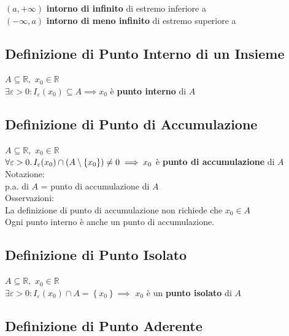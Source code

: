 \documentclass[a4paper, twoside, italian, 11pt]{book}
\newcommand{\braces}[1] {\left \{ #1 \right \}}
\newcommand{\R}{\mathbb{R}}
\begin{document}
$(a, +\infty)$ \textbf{intorno di infinito} di estremo inferiore a \\
\indent
$(-\infty, a)$ \textbf{intorno di meno infinito} di estremo superiore a


\subsection{Definizione di Punto Interno di un Insieme}

\noindent
$A \subseteq \R,$ $x_0 \in \R$ \\

$\exists \varepsilon > 0 : I_\varepsilon(x_0) \subseteq A \implies x_0$ è \textbf{punto interno} di $A$


\subsection{Definizione di Punto di Accumulazione}

\noindent
$A \subseteq \R,$ $x_0 \in \R$ \\

$\forall \varepsilon > 0 \ldotp I_\varepsilon(x_0) \cap (A \setminus \braces{x_0}) \neq 0 \implies x_0$ è \textbf{punto di accumulazione} di $A$ \\

\noindent
Notazione: \\
p.a. di $A$ = punto di accumulazione di $A$ \\

\noindent
Osservazioni: \\
La definizione di punto di accumulazione non richiede che $x_0 \in A$ \\
Ogni punto interno è anche un punto di accumulazione.


\subsection{Definizione di Punto Isolato}

\noindent
$A \subseteq \R,$ $x_0 \in \R$ \\

$\exists \varepsilon > 0 : I_\varepsilon(x_0) \cap A = \braces{x_0} \implies$ $x_0$ è un \textbf{punto isolato} di $A$


\subsection{Definizione di Punto Aderente}
\end{document}
